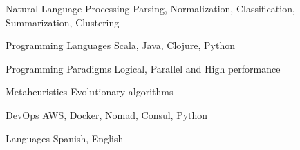 


\begin{cvskills}


\cvskill
{Natural Language Processing} %
{Parsing, Normalization, Classification, Summarization, Clustering} %




\cvskill
{Programming Languages} %
{Scala, Java, Clojure, Python} %


\cvskill
{Programming Paradigms} %
{Logical, Parallel and High performance} %


\cvskill
{Metaheuristics} %
{Evolutionary algorithms} %


\cvskill
{DevOps} %
{AWS, Docker, Nomad, Consul, Python} %


\cvskill
{Languages} %
{Spanish, English} %




\end{cvskills}

